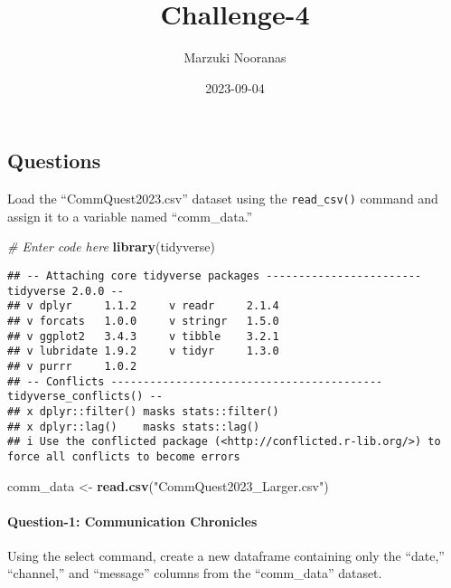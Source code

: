 \documentclass[
]{article}
\title{Challenge-4}
\author{Marzuki Nooranas}
\date{2023-09-04}
\newenvironment{Shaded}{\begin{snugshade}}{\end{snugshade}}
\newcommand{\CommentTok}[1]{\textcolor[rgb]{0.56,0.35,0.01}{\textit{#1}}}
\newcommand{\FunctionTok}[1]{\textcolor[rgb]{0.13,0.29,0.53}{\textbf{#1}}}
\newcommand{\NormalTok}[1]{#1}
\newcommand{\OtherTok}[1]{\textcolor[rgb]{0.56,0.35,0.01}{#1}}
\newcommand{\StringTok}[1]{\textcolor[rgb]{0.31,0.60,0.02}{#1}}
\begin{document}
\maketitle

\hypertarget{questions}{%
\subsection{Questions}\label{questions}}

Load the ``CommQuest2023.csv'' dataset using the \texttt{read\_csv()}
command and assign it to a variable named ``comm\_data.''

\begin{Shaded}
\begin{Highlighting}[]
\CommentTok{\# Enter code here}
\FunctionTok{library}\NormalTok{(tidyverse)}
\end{Highlighting}
\end{Shaded}

\begin{verbatim}
## -- Attaching core tidyverse packages ------------------------ tidyverse 2.0.0 --
## v dplyr     1.1.2     v readr     2.1.4
## v forcats   1.0.0     v stringr   1.5.0
## v ggplot2   3.4.3     v tibble    3.2.1
## v lubridate 1.9.2     v tidyr     1.3.0
## v purrr     1.0.2     
## -- Conflicts ------------------------------------------ tidyverse_conflicts() --
## x dplyr::filter() masks stats::filter()
## x dplyr::lag()    masks stats::lag()
## i Use the conflicted package (<http://conflicted.r-lib.org/>) to force all conflicts to become errors
\end{verbatim}

\begin{Shaded}
\begin{Highlighting}[]
\NormalTok{comm\_data }\OtherTok{\textless{}{-}} \FunctionTok{read.csv}\NormalTok{(}\StringTok{"CommQuest2023\_Larger.csv"}\NormalTok{)}
\end{Highlighting}
\end{Shaded}

\hypertarget{question-1-communication-chronicles}{%
\paragraph{Question-1: Communication
Chronicles}\label{question-1-communication-chronicles}}

Using the select command, create a new dataframe containing only the
``date,'' ``channel,'' and ``message'' columns from the ``comm\_data''
dataset.
\end{document}
